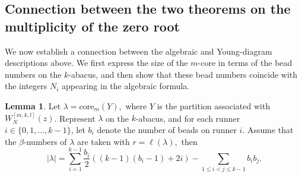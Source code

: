 \documentclass[preprint,3p,10pt]{elsarticle}
\theoremstyle{definition}
\newtheorem{lemma}{Lemma}[section]
\begin{document}
\subsection{Connection between the two theorems on the multiplicity of the zero root}
We now establish a connection between the algebraic and Young-diagram
descriptions above. We first express the size of the \(m\)-core in terms of
the bead numbers on the \(k\)-abacus, and then show that these bead numbers
coincide with the integers \(N_i\) appearing in the algebraic formula. 
\begin{lemma}\label{lem:size-of-core-by-runner-beads}
Let $\lambda=\mathrm{core}_m(Y),$ where $Y$ is the partition associated with $W_N^{[m,k,l]}(z)$.
Represent $\lambda$ on the $k$-abacus, and for each runner $i\in\{0,1,\dots,k-1\}$, let $b_i$
denote the number of beads on runner $i$.
Assume that the $\beta$-numbers of $\lambda$ are taken with $r=\ell(\lambda),$
then 
\begin{equation}\label{eq:core-size-ni-lemma}
|\lambda|
=
\sum_{i=1}^{k-1} \frac{b_i}{2} \left( (k - 1)(b_i - 1) + 2i \right)
-\sum_{1 \le i < j \le k-1} b_i b_j.
\end{equation}
\end{lemma}
\end{document}
